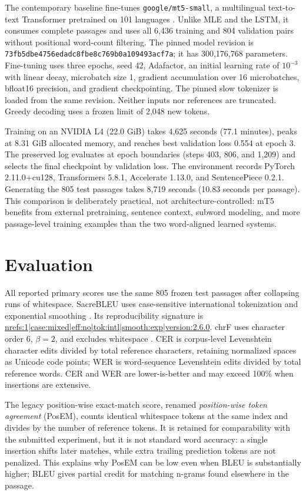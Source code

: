 \documentclass[runningheads]{llncs}
\begin{document}
The contemporary baseline fine-tunes \texttt{google/mt5-small}, a multilingual text-to-text Transformer pretrained on 101 languages \citep{xue-etal-2021-mt5}. Unlike MLE and the LSTM, it consumes complete passages and uses all 6,436 training and 804 validation pairs without positional word-count filtering. The pinned model revision is \texttt{73fb5dbe4756edadc8fbe8c769b0a109493acf7a}; it has 300,176,768 parameters. Fine-tuning uses three epochs, seed 42, Adafactor, an initial learning rate of $10^{-3}$ with linear decay, microbatch size 1, gradient accumulation over 16 microbatches, bfloat16 precision, and gradient checkpointing. The pinned slow tokenizer is loaded from the same revision. Neither inputs nor references are truncated. Greedy decoding uses a frozen limit of 2,048 new tokens.

Training on an NVIDIA L4 (22.0 GiB) takes 4,625 seconds (77.1 minutes), peaks at 8.31 GiB allocated memory, and reaches best validation loss 0.554 at epoch 3. The preserved log evaluates at epoch boundaries (steps 403, 806, and 1,209) and selects the final checkpoint by validation loss. The environment records PyTorch 2.11.0+cu128, Transformers 5.8.1, Accelerate 1.13.0, and SentencePiece 0.2.1. Generating the 805 test passages takes 8,719 seconds (10.83 seconds per passage). This comparison is deliberately practical, not architecture-controlled: mT5 benefits from external pretraining, sentence context, subword modeling, and more passage-level training examples than the two word-aligned learned systems.

\section{Evaluation}

All reported primary scores use the same 805 frozen test passages after collapsing runs of whitespace. SacreBLEU uses case-sensitive international tokenization and exponential smoothing \citep{papineni-etal-2002-bleu,post-2018-clarity}. Its reproducibility signature is \url{nrefs:1|case:mixed|eff:no|tok:intl|smooth:exp|version:2.6.0}. chrF uses character order 6, $\beta=2$, and excludes whitespace \citep{popovic-2015-chrf}. CER is corpus-level Levenshtein character edits divided by total reference characters, retaining normalized spaces as Unicode code points; WER is word-sequence Levenshtein edits divided by total reference words. CER and WER are lower-is-better and may exceed 100\% when insertions are extensive.

The legacy position-wise exact-match score, renamed \emph{position-wise token agreement} (PosEM), counts identical whitespace tokens at the same index and divides by the number of reference tokens. It is retained for comparability with the submitted experiment, but it is not standard word accuracy: a single insertion shifts later matches, while extra trailing prediction tokens are not penalized. This explains why PosEM can be low even when BLEU is substantially higher; BLEU gives partial credit for matching n-grams found elsewhere in the passage.
\end{document}
